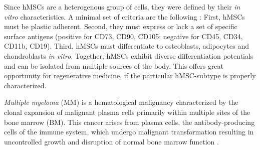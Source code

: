 Since hMSCs are a heterogenous group of cells, they were defined by their
\textit{in vitro} characteristics. A minimal set of criteria are the following
\cite{dominiciMinimalCriteriaDefining2006}: First, hMSCs must be plastic
adherent. Second, they must express or lack a set of specific surface antigens
(positive for CD73, CD90, CD105; negative for CD45, CD34, CD11b, CD19). Third,
hMSCs must differentiate to osteoblasts, adipocytes and chondroblasts \textit{in
    vitro}. Together, hMSCs exhibit diverse differentiation potentials and can be
isolated from multiple sources of the body. This offers great opportunity for
regenerative medicine, if the particular hMSC-subtype is properly characterized.


%
\label{sec:intro_myeloma}%
\emph{Multiple myeloma} (MM) is a hematological malignancy characterized by the
clonal expansion of malignant plasma cells primarily within multiple sites of
the bone marrow (BM). This cancer arises from plasma cells, the
antibody-producing cells of the immune system, which undergo malignant
transformation resulting in uncontrolled growth and disruption of normal bone
marrow function \cite{yangPathogenesisTreatmentMultiple2022}. 


